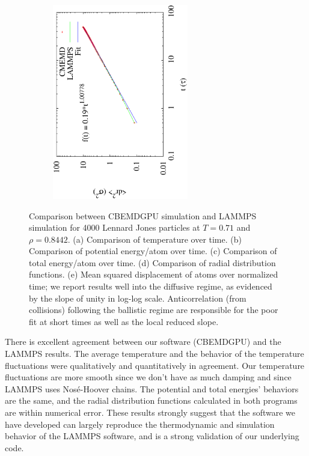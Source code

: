\documentclass[12pt]{article}
\begin{document}
\begin{figure}[H]
\begin{subfigure}{0.5\textwidth}
	\includegraphics[width=0.65\textwidth, angle=-90]{msd.eps}
	\caption{}
	\end{subfigure}
	\caption{Comparison between CBEMDGPU simulation and LAMMPS simulation for 4000 Lennard Jones particles at $T=0.71$ and $\rho=0.8442$. (a) Comparison of temperature over time. (b) Comparison of potential energy/atom over time. (c) Comparison of total energy/atom over time. (d) Comparison of radial distribution functions. (e) Mean squared displacement of atoms over normalized time; we report results well into the diffusive regime, as evidenced by the slope of unity in log-log scale.  Anticorrelation (from collisions) following the ballistic regime are responsible for the poor fit at short times as well as the local reduced slope.}
	\label{fig:lmp_compare}
\end{figure}

There is excellent agreement between our software (CBEMDGPU) and the LAMMPS results. The average temperature and the behavior of the temperature fluctuations were qualitatively and quantitatively in agreement. Our temperature fluctuations are more smooth since we don't have as much damping and since LAMMPS uses Nos\'{e}-Hoover chains. The potential and total energies' behaviors are the same, and the radial distribution functions calculated in both programs are within numerical error. These results strongly suggest that the software we have developed can largely reproduce the thermodynamic and simulation behavior of the LAMMPS software, and is a strong validation of our underlying code.
\end{document}
